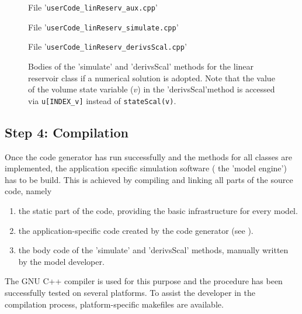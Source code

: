\begin{figure*}
  File '\verb!userCode_linReserv_aux.cpp!'
  
  File '\verb!userCode_linReserv_simulate.cpp!'
  
  File '\verb!userCode_linReserv_derivsScal.cpp!'
  
  \caption[Bodies of the 'simulate' and 'derivsScal' methods for the linear reservoir class if a numerical solution is adopted.]{Bodies of the 'simulate' and 'derivsScal' methods for the linear reservoir class if a numerical solution is adopted. Note that the value of the volume state variable ($v$) in the 'derivsScal'method is accessed via \texttt{u[INDEX\_v]} instead of \texttt{stateScal(v)}. \label{fig:concept-classDef-implementation-numerical}}
\end{figure*}

\subsection{Step 4: Compilation} \label{sec:concept-classDef-compile}

Once the code generator has run successfully and the methods for all classes are implemented, the application specific simulation software (\ie{} the 'model engine') has to be build. This is achieved by compiling and linking all parts of the source code, namely
\begin{enumerate}
  \item the static part of the code, providing the basic infrastructure for every model.
  \item the application-specific code created by the code generator (see ).
  \item the body code of the 'simulate' and 'derivsScal' methods, manually written by the model developer.
\end{enumerate}

The GNU C++ compiler is used for this purpose and the procedure has been successfully tested on several platforms. To assist the developer in the compilation process, platform-specific makefiles are available.

